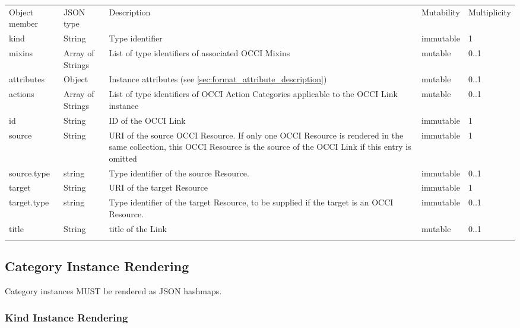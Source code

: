 \documentclass[10pt,a4paper]{article}
\begin{document}
 {
    \begin{tabularx}{\textwidth}{llXll}
    \toprule
    Object member & JSON type & Description & Mutability & Multiplicity \\
    \colrule
    kind & String & Type identifier & immutable & 1 \\

    mixins & Array of Strings & List of type identifiers of associated OCCI
Mixins & mutable & 0..1 \\

    attributes & Object & Instance attributes (see
\ref{sec:format_attribute_description}) & mutable & 0..1 \\

    actions & Array of Strings & List of type identifiers of OCCI
Action Categories applicable to the OCCI Link instance & mutable & 0..1 \\

    id & String & ID of the OCCI Link & immutable & 1\\

    source & String & URI of the source OCCI Resource. If only one OCCI
Resource is rendered in the same collection, this OCCI Resource is the
source of the OCCI Link if this entry is omitted & immutable & 1\\

    source.type & string & Type identifier of the source Resource. & immutable & 0..1 \\

    target & String & URI of the target Resource & immutable & 1\\

    target.type & string & Type identifier of the target Resource, to be supplied if
the target is an OCCI Resource. & immutable & 0..1 \\

	title & String & title of the Link & mutable & 0..1\\
    \botrule
    \end{tabularx}
}

\subsection{Category Instance Rendering}
\label{sec:format_category_instance_rendering}
Category instances MUST be rendered as JSON hashmaps.

\subsubsection{Kind Instance Rendering}
\label{sec:format_kind}
\end{document}
